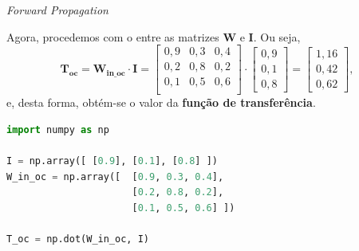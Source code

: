\begin{frame}[fragile]{\textit{Forward Propagation} \cont}
	
	Agora, procedemos com o  entre as matrizes $\mathbf{W}$ e $\mathbf{I}$. Ou seja,
	\begin{equation}
		\mathbf{T_{\text{oc}}} = \mathbf{W_{\text{in\_oc}}} \cdot \mathbf{I} = 
		\begin{bmatrix}
			0,9 & 0,3 & 0,4 \\ 
			0,2 & 0,8 & 0,2 \\
			0,1 & 0,5 & 0,6 \\
		\end{bmatrix}
		\cdot
		\begin{bmatrix}
			0,9 \\ 
			0,1 \\ 
			0,8 
		\end{bmatrix}
		=
		\begin{bmatrix}
			1,16 \\ 
			0,42 \\ 
			0,62 
		\end{bmatrix},
	\end{equation}
	e, desta forma, obtém-se o valor da \textbf{função de transferência}.
	    
	\bigskip
	\bigskip
	    
    \pausenormal
	    
	\begin{lstlisting}[language=Python]
import numpy as np

I = np.array([ [0.9], [0.1], [0.8] ])
W_in_oc = np.array([  [0.9, 0.3, 0.4], 
                      [0.2, 0.8, 0.2], 
                      [0.1, 0.5, 0.6] ])

T_oc = np.dot(W_in_oc, I)\end{lstlisting}
    
\end{frame}

